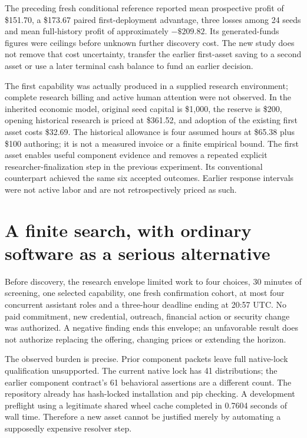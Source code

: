 \documentclass[11pt,letterpaper]{article}
\newcommand{\USD}[1]{\$#1}
\begin{document}
The preceding fresh conditional reference reported mean prospective profit of \USD{151.70}, a \USD{173.67} paired first-deployment advantage, three losses among 24 seeds and mean full-history profit of approximately $-\USD{209.82}$. Its generated-funds figures were ceilings before unknown further discovery cost. The new study does not remove that cost uncertainty, transfer the earlier first-asset saving to a second asset or use a later terminal cash balance to fund an earlier decision.

The first capability was actually produced in a supplied research environment; complete research billing and active human attention were not observed. In the inherited economic model, original seed capital is \USD{1,000}, the reserve is \USD{200}, opening historical research is priced at \USD{361.52}, and adoption of the existing first asset costs \USD{32.69}. The historical allowance is four assumed hours at \USD{65.38} plus \USD{100} authoring; it is not a measured invoice or a finite empirical bound. The first asset enables useful component evidence and removes a repeated explicit researcher-finalization step in the previous experiment. Its conventional counterpart achieved the same six accepted outcomes. Earlier response intervals were not active labor and are not retrospectively priced as such.

\section{A finite search, with ordinary software as a serious alternative}

Before discovery, the research envelope limited work to four choices, 30 minutes of screening, one selected capability, one fresh confirmation cohort, at most four concurrent assistant roles and a three-hour deadline ending at 20:57 UTC. No paid commitment, new credential, outreach, financial action or security change was authorized. A negative finding ends this envelope; an unfavorable result does not authorize replacing the offering, changing prices or extending the horizon.

The observed burden is precise. Prior component packets leave full native-lock qualification unsupported. The current native lock has 41 distributions; the earlier component contract's 61 behavioral assertions are a different count. The repository already has hash-locked installation and pip checking. A development preflight using a legitimate shared wheel cache completed in 0.7604 seconds of wall time. Therefore a new asset cannot be justified merely by automating a supposedly expensive resolver step.
\end{document}
